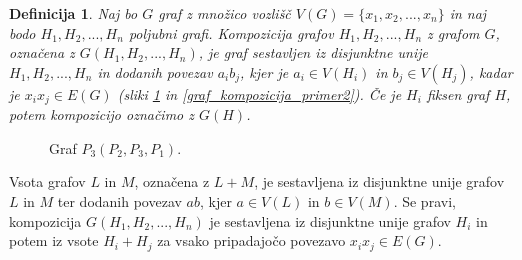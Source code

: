 \documentclass[a4paper, 12pt]{book}
\newtheorem{definicija}{Definicija}[chapter]
\begin{document}
\begin{definicija}
    Naj bo $G$ graf z množico vozlišč $V(G) = \{x_1, x_2, ..., x_n\}$ in naj bodo $H_1, H_2, ..., H_n$ poljubni grafi. Kompozicija grafov $H_1, H_2, ..., H_n$ z grafom $G$, označena z $G(H_1, H_2, ..., H_n)$, je graf sestavljen iz disjunktne unije $H_1, H_2, ..., H_n$ in dodanih povezav $a_ib_j$, kjer je $a_i \in V(H_i)$ in $b_j \in V(H_j)$, kadar je $x_ix_j \in E(G)$ (sliki \ref{graf_kompozicija_primer1} in \ref{graf_kompozicija_primer2}). Če je $H_i$ fiksen graf $H$, potem kompozicijo označimo z $G(H)$. 
\end{definicija}

\begin{figure}[h]
    \begin{center}        
    \end{center}
    \caption{Graf $P_3(P_2, P_3, P_1)$.}
    \label{graf_kompozicija_primer1}
\end{figure}

Vsota grafov $L$ in $M$, označena z $L + M$, je sestavljena iz disjunktne unije grafov $L$ in $M$ ter dodanih povezav $ab$, kjer $a \in V(L)$ in $b \in V(M)$. Se pravi, kompozicija $G(H_1, H_2, ..., H_n)$ je sestavljena iz disjunktne unije grafov $H_i$ in potem iz vsote $H_i + H_j$ za vsako pripadajočo povezavo $x_ix_j \in E(G)$.
\end{document}
